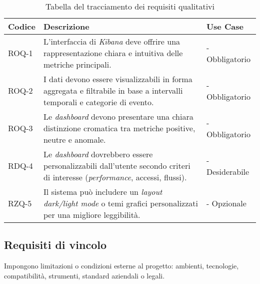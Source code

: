 \begin{table}[h]
\caption{Tabella del tracciamento dei requisiti qualitativi}
\label{tab:requisiti-qualitativi}
\begin{tabularx}{\textwidth}{lXl}
\hline\hline
\textbf{Codice} & \textbf{Descrizione} & \textbf{Use Case}\\
\hline
ROQ-1    & L'interfaccia di \emph{Kibana} deve offrire una rappresentazione chiara e intuitiva delle metriche principali. & - Obbligatorio \\
\hline

\hline
ROQ-2    & I dati devono essere visualizzabili in forma aggregata e filtrabile in base a intervalli temporali e categorie di evento. & - Obbligatorio\\
\hline

\hline
ROQ-3    & Le \emph{dashboard} devono presentare una chiara distinzione cromatica tra metriche positive, neutre e anomale. & - Obbligatorio\\
\hline

\hline
RDQ-4    & Le \emph{dashboard} dovrebbero essere personalizzabili dall'utente secondo criteri di interesse (\emph{performance}, accessi, flussi). & - Desiderabile \\
\hline

\hline
RZQ-5    & Il sistema può includere un \emph{layout dark/light mode} o temi grafici personalizzati per una migliore leggibilità. & - Opzionale \\
\hline

\end{tabularx}
\end{table}%

\newpage
\subsection{Requisiti di vincolo}
Impongono limitazioni o condizioni esterne al progetto: ambienti, tecnologie, compatibilità, strumenti, standard aziendali o legali.


